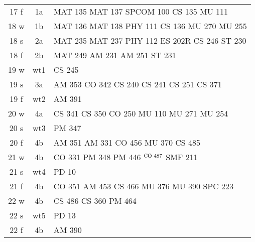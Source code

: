 \documentclass[convert]{standalone}
\newcommand{\opt}[1]{{\color{gray!50}#1}}
\newcommand{\opw}[1]{{\color{white}#1}}
\begin{document}
\begin{tabular}{|c | c | l |}
	\hline
	17 f & 1a & MAT 135 \quad MAT 137 \quad SPCOM 100 \quad CS 135 \quad MU 111 \\
	18 w & 1b & MAT 136 \quad MAT 138 \quad PHY 111 \quad CS 136 \quad MU 270 \quad MU 255\\
	18 s & 2a & MAT 235 \quad MAT 237 \quad PHY 112 \quad ES 202R \quad CS 246 \quad ST  230 \\
	18 f & 2b & MAT 249 \quad AM 231 \quad AM 251 \quad ST  231 \\
	19 w & wt1 & CS 245 \\
	19 s & 3a & AM 353 \quad CO 342 \quad CS 240 \quad CS 241 \quad CS 251 \quad CS 371 \\
	19 f & wt2 & AM 391 \\
	20 w & 4a & CS 341 \quad CS 350 \quad CO 250  \quad MU 110 \quad MU 271 \quad MU 254 \\
	20 s & wt3 & PM 347 \\
	20 f & 4b & AM 351 \quad AM 331   \quad CO 456 \quad MU 370 \quad CS 485 \\
	21 w & 4b &  CO 331 \quad PM 348  \quad PM 446 \quad \opw{MU 371}  \quad \opw{EC 212}$^{\text{\scriptsize CO 487}}$ \quad SMF 211 \\
	21 s & wt4 & PD 10  \\
	21 f & 4b & CO 351  \quad AM 453 \quad CS 466 \quad MU 376 \quad MU 390 \quad SPC 223    \\
	22 w & 4b & CS 486 \quad CS 360 \quad PM 464    \\
	22 s & wt5 & PD 13 \\
	22 f & 4b &  \opt{AM 390}   \\\hline

\end{tabular}
\end{document}
